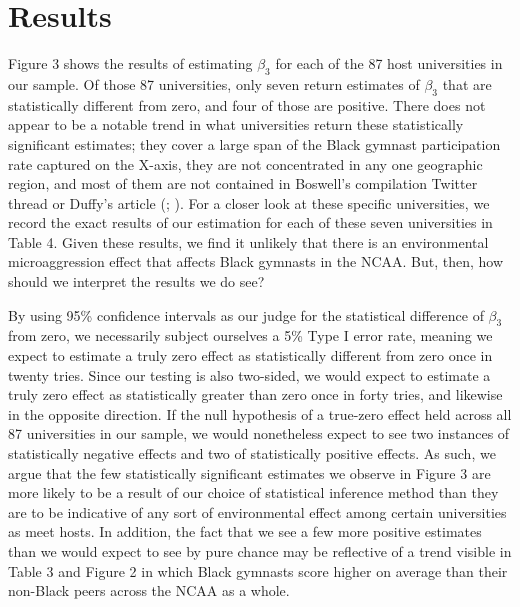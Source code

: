 \documentclass[12pt]{article}
\begin{document}

\section{Results}

Figure 3 shows the results of estimating $\beta_3$ for each of the 87 host universities in our sample. Of those 87 universities, only seven return estimates of $\beta_3$ that are statistically different from zero, and four of those are positive. There does not appear to be a notable trend in what universities return these statistically significant estimates; they cover a large span of the Black gymnast participation rate captured on the X-axis, they are not concentrated in any one geographic region, and most of them are not contained in Boswell's compilation Twitter thread or Duffy's article (\citealp{boswell_2020}; \citealp{duffy_2020}). For a closer look at these specific universities, we record the exact results of our estimation for each of these seven universities in Table 4. Given these results, we find it unlikely that there is an environmental microaggression effect that affects Black gymnasts in the NCAA. But, then, how should we interpret the results we do see?

By using 95\% confidence intervals as our judge for the statistical difference of $\beta_3$ from zero, we necessarily subject ourselves a 5\% Type I error rate, meaning we expect to estimate a truly zero effect as statistically different from zero once in twenty tries. Since our testing is also two-sided, we would expect to estimate a truly zero effect as statistically greater than zero once in forty tries, and likewise in the opposite direction. If the null hypothesis of a true-zero effect held across all 87 universities in our sample, we would nonetheless expect to see two instances of statistically negative effects and two of statistically positive effects. As such, we argue that the few statistically significant estimates we observe in Figure 3 are more likely to be a result of our choice of statistical inference method than they are to be indicative of any sort of environmental effect among certain universities as meet hosts. In addition, the fact that we see a few more positive estimates than we would expect to see by pure chance may be reflective of a trend visible in Table 3 and Figure 2 in which Black gymnasts score higher on average than their non-Black peers across the NCAA as a whole.  
\end{document}
